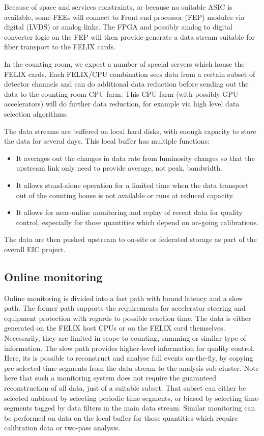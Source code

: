 Because of space and services constraints, or because no suitable ASIC is available, some FEEs will connect to Front end processor (FEP) modules via digital (LVDS) or analog links. The FPGA and possibly analog to digital converter logic on the FEP will then provide generate a data stream suitable for fiber transport to the FELIX cards.

In the counting room, we expect a number of special servers which house the FELIX cards. Each FELIX/CPU combination sees data from a certain subset of detector channels and can do additional data reduction before sending out the data to the counting room CPU farm. This CPU farm (with possibly GPU accelerators) will do further data reduction, for example via high level data selection algorithms.

The data streams are buffered on local hard disks, with enough capacity to store the data for several days. This local buffer has multiple functions: 
\begin{itemize}
    \item It averages out the changes in data rate from luminosity changes so that the upstream link only need to provide average, not peak, bandwidth.
    \item It allows stand-alone operation for a limited time when the data transport out of the counting house is not available or runs at reduced capacity.
    \item It allows for near-online monitoring and replay of recent data for quality control, especially for those quantities which depend on on-going calibrations.        
\end{itemize}

The data are then pushed upstream to on-site or federated storage as part of the overall EIC project.


\subsection{Online monitoring}
Online monitoring is divided into a fast path with bound latency and a slow path. The former path supports the requirements for accelerator steering and equipment protection with regards to possible reaction time. The data is either generated on the FELIX host CPUs or on the FELIX card themselves. Necessarily, they are limited in scope to counting, summing or similar type of information. The slow path provides higher-level information for quality control. Here, its is possible to reconstruct and analyse full events on-the-fly, by copying pre-selected time segments from the data stream to the analysis sub-cluster. Note here that such a monitoring system does not require the guaranteed reconstruction of all data, just of a suitable subset. That subset can either be selected unbiased by selecting periodic time segments, or biased by selecting time-segments tagged by data filters in the main data stream.  Similar monitoring can be performed on data on the local buffer for those quantities which require calibration data or two-pass analysis.

